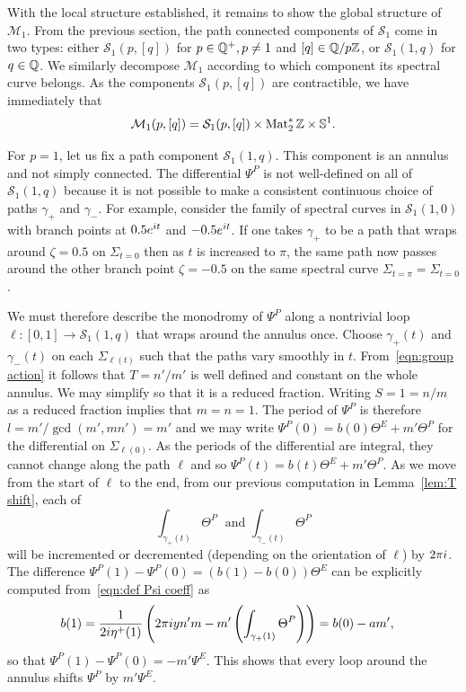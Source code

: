 \documentclass{article}
\begin{document}
With the local structure established, it remains to show the global structure of $\mathcal{M}_1$. From the previous section, the path connected components of $\mathcal{S}_1$ come in two types: either $\mathcal{S}_1(p,[q])$ for $p\in\mathbb{Q}^+, p\neq 1$ and $[q]\in\mathbb{Q}/p\mathbb{Z}$, or  $\mathcal{S}_1(1,q)$ for $q\in\mathbb{Q}$. We similarly decompose $\mathcal{M}_1$ according to which component its spectral curve belongs. As the components $\mathcal{S}_1(p,[q])$ are contractible, we have immediately that
\[
\mathcal{M}_1(p, [q]) = \mathcal{S}_1(p,[q]) \times \operatorname{Mat}_2^*\mathbb{Z} \times \mathbb{S}^1.
\]

For $p=1$, let us fix a path component $\mathcal{S}_1(1,q)$.
This component is an annulus and not simply connected. The differential $\Psi^P$ is not well-defined on all of $\mathcal{S}_1(1,q)$ because it is not possible to make a consistent continuous choice of paths $\gamma_+$ and $\gamma_-$. For example, consider the family of spectral curves in $\mathcal{S}_1(1,0)$ with branch points at $0.5 e^{i t}$ and $-0.5 e^{i t}$. If one takes $\gamma_+$ to be a path that wraps around $\zeta = 0.5$ on $\Sigma_{t=0}$ then as $t$ is increased to $\pi$, the same path now passes around the other branch point $\zeta=-0.5$ on the same spectral curve $\Sigma_{t=\pi} = \Sigma_{t=0}$. 

We must therefore describe the monodromy of $\Psi^P$ along a nontrivial loop $\ell : [0,1] \to \mathcal{S}_1(1,q)$ that wraps around the annulus once. 
Choose $\gamma_+(t)$ and $\gamma_-(t)$ on each $\Sigma_{\ell(t)}$ such that the paths vary smoothly in $t$.
From~\eqref{eqn:group action} it follows that $T = n'/m'$ is well defined and constant on the whole annulus. We may simplify so that it is a reduced fraction. Writing $S=1=n/m$ as a reduced fraction implies that $m=n=1$. The period of $\Psi^P$ is therefore $l = m' / \gcd(m',mn') = m'$ and we may write $\Psi^P(0) = b(0)\Theta^E + m' \Theta^P$ for the differential on $\Sigma_{\ell(0)}$. As the periods of the differential are integral, they cannot change along the path $\ell$ and so $\Psi^P(t) = b(t) \Theta^E + m' \Theta^P.$
As we move from the start of $\ell$ to the end, from our previous computation in Lemma~\ref{lem:T shift}, each of
\[
\int_{\gamma_+(t)} \Theta^P \;\text{ and } \int_{\gamma_-(t)} \Theta^P
\]
will be incremented or decremented (depending on the orientation of $\ell$) by $2\pi i$. The difference $\Psi^P(1) - \Psi^P(0) = (b(1)-b(0))\Theta^E$ can be explicitly computed from~\eqref{eqn:def Psi coeff} as
\begin{align*}
b(1)
&= \frac{1}{2i \eta^+(1)}\left( 2\pi i y n'm - m' \left(\int_{\gamma_+(1)} \Theta^P\right) \right)
= b(0) - am',
\end{align*}
so that $\Psi^P(1) - \Psi^P(0) = - m' \Psi^E$. This shows that every loop around the annulus shifts $\Psi^P$ by $m' \Psi^E$.
\end{document}
